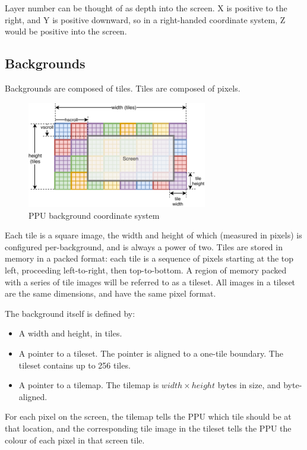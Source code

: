 Layer number can be thought of as depth into the screen. X is positive to the right, and Y is positive downward, so in a right-handed coordinate system, Z would be positive into the screen.

\subsection{Backgrounds}

Backgrounds are composed of tiles. Tiles are composed of pixels.

\begin{figure}[H]
\centering
\caption{PPU background coordinate system}
\label{diagram:ppu_bg_coords}
\includegraphics[width=0.7\textwidth]{diagrams/ppu_bg_coords.pdf}
\end{figure}

Each tile is a square image, the width and height of which (measured in pixels) is configured per-background, and is always a power of two. Tiles are stored in memory in a packed format: each tile is a sequence of pixels starting at the top left, proceeding left-to-right, then top-to-bottom. A region of memory packed with a series of tile images will be referred to as a tileset. All images in a tileset are the same dimensions, and have the same pixel format.

The background itself is defined by:

\begin{itemize}
	\item A width and height, in tiles.
	\item A pointer to a tileset. The pointer is aligned to a one-tile boundary. The tileset contains up to 256 tiles.
	\item A pointer to a tilemap. The tilemap is $width \times height$ bytes in size, and byte-aligned.
\end{itemize}

For each pixel on the screen, the tilemap tells the PPU which tile should be at that location, and the corresponding tile image in the tileset tells the PPU the colour of each pixel in that screen tile.


